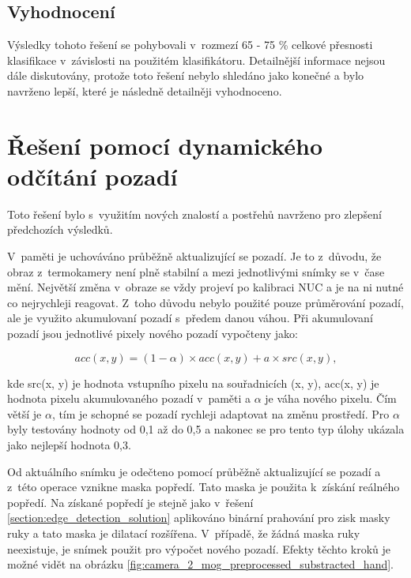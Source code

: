 	\subsection{Vyhodnocení}
    Výsledky tohoto řešení se pohybovali v~rozmezí 65 - 75 \% celkové přesnosti klasifikace v~závislosti na použitém klasifikátoru. Detailnější informace nejsou dále diskutovány, protože toto řešení nebylo shledáno jako konečné a bylo navrženo lepší, které je následně detailněji vyhodnoceno.
         
\clearpage

\section{Řešení pomocí dynamického odčítání pozadí} \label{section:background_substract_solution}
Toto řešení bylo s~využitím nových znalostí a postřehů navrženo pro zlepšení předchozích výsledků. %

V~paměti je uchováváno průběžně aktualizující se pozadí. Je to z~důvodu, že obraz z~termokamery není plně stabilní a mezi jednotlivými snímky se v~čase mění. Největší změna v~obraze se vždy projeví po  kalibraci NUC a je na ni nutné co nejrychleji reagovat. Z~toho důvodu nebylo použité pouze průměrování pozadí, ale je využito akumulovaní pozadí s~předem danou váhou. Při akumulovaní pozadí jsou jednotlivé pixely nového pozadí vypočteny jako:

\begin{equation}
	acc(x, y) = (1 - \alpha) \times acc(x, y) + a \times src(x,y),
\end{equation}

kde src(x, y) je hodnota vstupního pixelu na souřadnicích (x, y), acc(x, y) je hodnota pixelu akumulovaného pozadí v~paměti a $\alpha$ je váha nového pixelu. Čím větší je $\alpha$, tím je schopné se pozadí rychleji adaptovat na změnu prostředí. Pro $\alpha$ byly testovány hodnoty od 0,1 až do 0,5 a nakonec se pro tento typ úlohy ukázala jako nejlepší hodnota 0,3.

Od aktuálního snímku je odečteno pomocí \cite{opencvMOG} průběžně aktualizující se pozadí a z~této operace vznikne maska popředí. Tato maska je použita k~získání reálného popředí. Na získané popředí je stejně jako v~řešení \ref{section:edge_detection_solution} aplikováno binární prahování pro zisk masky ruky a tato maska je dilatací rozšířena. V~případě, že žádná maska ruky neexistuje, je snímek použit pro výpočet nového pozadí. Efekty těchto kroků je možné vidět na obrázku \ref{fig:camera_2_mog_preprocessed_substracted_hand}.

